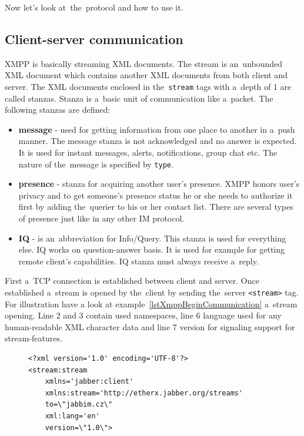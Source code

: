 Now let's look at~the~protocol and how to use it. 

\subsection*{Client-server communication}
XMPP is basically streaming XML documents. The stream is an~unbounded XML document which contains another XML documents from both client and server. The XML documents enclosed in the~\verb|stream| tags with a~depth of 1 are called stanzas. Stanza is a~basic unit of communication like a~packet. The following stanzas are defined:

\begin{itemize}
	\item \textbf{message} - used for getting information from one place to another in a~push manner. The message stanza is not acknowledged and no answer is expected. It is used for instant messages, alerts, notifications, group chat etc. The nature of the~message is specified by \verb|type|.  
	\item \textbf{presence} - stanza for acquiring another user's presence. XMPP honors user's privacy and to get someone's presence status he or she needs to authorize it first by adding the~querier to his or her contact list. There are several types of presence just like in any other IM protocol.     
	\item	\textbf{IQ} - is an~abbreviation for Info/Query. This stanza is used for everything else. IQ works on question-answer basis. It is used for example for getting remote client's capabilities. IQ stanza must always receive a~reply. 
\end{itemize}

First a~TCP connection is established between client and server. Once established a~stream is opened by the~client by sending the~server \verb|<stream>| tag. For illustration have a look at example~\ref{lstXmppBeginCommunication}  a~stream opening. Line 2 and 3 contain used namespaces, line 6 language used for any human-readable XML character data and line 7 version for signaling support for stream-features.

\begin{figure}[h]
\begin{lstlisting}
<?xml version='1.0' encoding='UTF-8'?>
<stream:stream 
	xmlns='jabber:client' 
	xmlns:stream='http://etherx.jabber.org/streams' 
	to=\"jabbim.cz\" 
	xml:lang='en'
	version=\"1.0\">
\end{lstlisting}
\end{figure}

